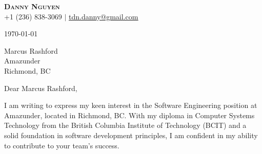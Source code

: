 \documentclass[letterpaper,11pt]{article}
\begin{document}
\begin{center}
\textbf{\Huge \scshape Danny Nguyen} \\ \vspace{1pt}
\small +1 (236) 838-3069 $|$ \href{mailto:tdn.danny@gmail.com}{\underline{tdn.danny@gmail.com}}
\end{center}

\today

Marcus Rashford \\
Amazunder \\
Richmond, BC
\vspace{20pt}

Dear Marcus Rashford,

\vspace{10pt}

I am writing to express my keen interest in the Software Engineering position at Amazunder, located in Richmond, BC. With my diploma in Computer Systems Technology from the British Columbia Institute of Technology (BCIT) and a solid foundation in software development principles, I am confident in my ability to contribute to your team's success.

\vspace{10pt}
\end{document}
